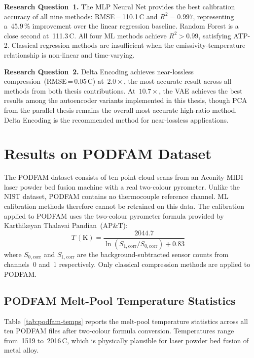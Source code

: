 \textbf{Research Question~1.} The MLP Neural Net provides the best calibration accuracy of all nine methods: RMSE\,=\,110.1\,\textdegree C and $R^2=0.997$, representing a~45.9\,\% improvement over the linear regression baseline. Random Forest is a close second at~111.3\,\textdegree C. All four ML methods achieve $R^2>0.99$, satisfying ATP-2. Classical regression methods are insufficient when the emissivity-temperature relationship is non-linear and time-varying.

\textbf{Research Question~2.} Delta Encoding achieves near-lossless compression~(RMSE\,=\,0.05\,\textdegree C) at~$2.0\times$, the most accurate result across all methods from both thesis contributions. At~$10.7\times$, the VAE achieves the best results among the autoencoder variants implemented in this thesis, though PCA from the parallel thesis remains the overall most accurate high-ratio method. Delta Encoding is the recommended method for near-lossless applications.

\let\cleardoublepage\clearpage

\section{Results on PODFAM Dataset}
\label{sec:podfam-results}

The PODFAM dataset consists of ten point cloud scans from an Aconity MIDI laser powder bed fusion machine with a real two-colour pyrometer. Unlike the NIST dataset, PODFAM contains no thermocouple reference channel. ML calibration methods therefore cannot be retrained on this data. The calibration applied to PODFAM uses the two-colour pyrometer formula provided by Karthikeyan Thalavai Pandian~(AP\&T):
\begin{equation}
T\,(\text{K}) = \frac{2044.7}{\ln(S_{1,\text{corr}}/S_{0,\text{corr}}) + 0.83}
\label{eq:two-colour}
\end{equation}
where $S_{0,\text{corr}}$ and $S_{1,\text{corr}}$ are the background-subtracted sensor counts from channels~0 and~1 respectively. Only classical compression methods are applied to PODFAM.

\subsection{PODFAM Melt-Pool Temperature Statistics}

Table~\ref{tab:podfam-temps} reports the melt-pool temperature statistics across all ten PODFAM files after two-colour formula conversion. Temperatures range from~1519 to~2016\,\textdegree C, which is physically plausible for laser powder bed fusion of metal alloy.

